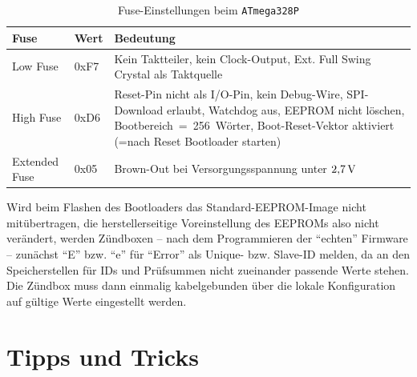 \documentclass[pdftex, parskip, numbers=noenddot, toc=listof]{scrbook}
\begin{document}
	\begin{table}[h]
		\centering
		\begin{tabularx}{.9\textwidth}{llX}
			\hline\hline
			\textbf{Fuse} & \textbf{Wert}     & \textbf{Bedeutung}                                                                                                                                                                               \\ \hline
			Low Fuse      & 0xF7              & Kein Taktteiler, kein Clock-Output, Ext. Full Swing Crystal als Taktquelle                                                                                                                       \\
			High Fuse     & 0xD6              & Reset-Pin nicht als I/O-Pin, kein Debug-Wire, SPI-Download erlaubt, Watchdog aus, EEPROM nicht löschen, Bootbereich~=~256~Wörter, Boot-Reset-Vektor aktiviert (=nach Reset Bootloader starten) \\
			Extended Fuse & 0x05\footnotemark & Brown-Out bei Versorgungsspannung unter $\unit[2{,}7]{V}$                                                                                                                                        \\ \hline\hline
		\end{tabularx}
		\caption{Fuse-Einstellungen beim \texttt{ATmega328P}}
		\label{tab:fuses}
	\end{table}

	Wird beim Flashen des Bootloaders das Standard-EEPROM-Image nicht mitübertragen, die herstellerseitige Voreinstellung des EEPROMs also nicht verändert, werden Zündboxen -- nach dem Programmieren der \enquote{echten} Firmware -- zunächst \enquote{E} bzw. \enquote{e} für \enquote{Error} als Unique- bzw. Slave-ID melden, da an den Speicherstellen für IDs und Prüfsummen nicht zueinander passende Werte stehen. Die Zündbox muss dann einmalig kabelgebunden über die lokale Konfiguration auf gültige Werte eingestellt werden.


	\chapter{Tipps und Tricks}
\end{document}
